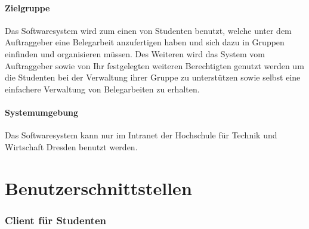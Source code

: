 \documentclass{article}
\begin{document}
\subsection{Zielgruppe}
Das Softwaresystem wird zum einen von Studenten benutzt, welche unter dem Auftraggeber eine Belegarbeit anzufertigen haben und sich dazu in Gruppen einfinden und organisieren müssen.
Des Weiteren wird das System vom Auftraggeber sowie von Ihr festgelegten weiteren Berechtigten genutzt werden um die Studenten bei der Verwaltung ihrer Gruppe zu unterstützen sowie selbst eine einfachere Verwaltung von Belegarbeiten zu erhalten.
\subsection{Systemumgebung}
Das Softwaresystem kann nur im Intranet der Hochschule für Technik und Wirtschaft Dresden benutzt werden. 

\newpage
\part{Benutzerschnittstellen}
\section{Client für Studenten}
\end{document}

